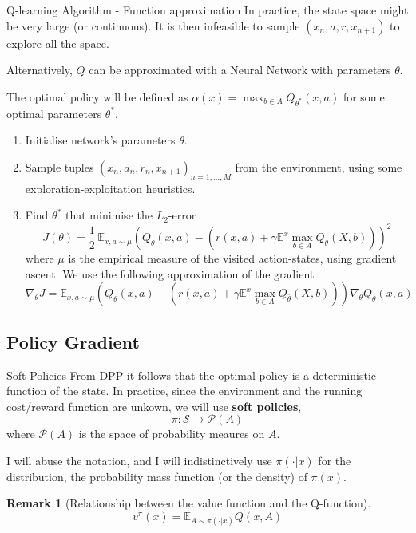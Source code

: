 \documentclass{beamer}
\newtheorem{remark}{Remark}[theorem]
\begin{document}
\begin{frame}{Q-learning Algorithm - Function approximation}
In practice, the state space might be very large (or continuous). It is then infeasible to sample $(x_n, a, r, x_{n+1})$ to explore all the space. 

Alternatively, $Q$ can be approximated with a Neural Network with parameters $\theta$. 

The optimal policy will be defined as $\alpha(x) = \max_{b\in A} Q_{\theta^*}(x,a)$ for some optimal parameters $\theta^*$.
\begin{enumerate}
\item Initialise network's parameters $\theta$.
\item Sample tuples $(x_n, a_n, r_n, x_{n+1})_{n=1,...,M}$ from the environment, using some exploration-exploitation heuristics. 
\item Find $\theta^*$ that minimise the $L_2$-error
\[
J(\theta) = \frac1{2}\, \mathbb E_{x,a\sim \mu} \left(Q_\theta(x,a) - (r(x,a) + \gamma \mathbb E^x \max_{b\in A} Q_{\bar \theta}(X,b)) \right)^2
\] 
where $\mu$ is the empirical measure of the visited  action-states,
using gradient ascent. We use the following approximation of the gradient
\[
\nabla_\theta J = \mathbb E_{x,a \sim \mu}\left(Q_\theta(x,a) - (r(x,a) + \gamma \mathbb E^x \max_{b\in A} Q_{\bar \theta}(X,b)) \right)\nabla_\theta Q_\theta(x,a)
\] 
\end{enumerate}
\end{frame}

\subsection{Policy Gradient}
\begin{frame}{Soft Policies}
From DPP it follows that the optimal policy is a deterministic function of the state. In practice, since the environment and the running cost/reward function are unkown, we will use \textbf{soft policies},
\[
\pi: \mathcal S \rightarrow \mathcal P(A)
\]
where $\mathcal P(A)$ is the space of probability meaures on $A$. 

I will abuse the notation, and I will indistinctively use  $\pi(\cdot | x)$ for the distribution, the probability mass function (or the density) of $\pi(x)$.

\begin{remark}[Relationship between the value function and the Q-function]
\[
v^\pi(x) = \mathbb E_{A\sim \pi(\cdot|x)} Q(x,A)
\]
\end{remark}


\end{frame}
\end{document}
